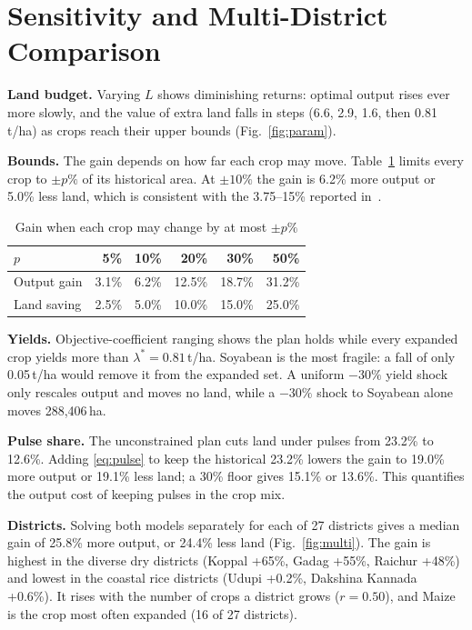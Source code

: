 \documentclass[conference]{IEEEtran}
\begin{document}
\section{Sensitivity and Multi-District Comparison}
\textbf{Land budget.} Varying $L$ shows diminishing returns: optimal output rises ever more
slowly, and the value of extra land falls in steps (6.6, 2.9, 1.6, then 0.81\,t/ha) as crops
reach their upper bounds (Fig.~\ref{fig:param}).

\textbf{Bounds.} The gain depends on how far each crop may move. Table~\ref{tab:band} limits
every crop to $\pm p\%$ of its historical area. At $\pm10\%$ the gain is 6.2\% more output or
5.0\% less land, which is consistent with the 3.75--15\% reported in~\cite{supriya2022}.

\begin{table}[!t]
\centering
\caption{Gain when each crop may change by at most $\pm p\%$}\label{tab:band}
\begin{tabular}{@{}lrrrrr@{}}
\toprule
$p$ & 5\% & 10\% & 20\% & 30\% & 50\%\\
\midrule
Output gain & 3.1\% & 6.2\% & 12.5\% & 18.7\% & 31.2\%\\
Land saving & 2.5\% & 5.0\% & 10.0\% & 15.0\% & 25.0\%\\
\bottomrule
\end{tabular}
\end{table}

\textbf{Yields.} Objective-coefficient ranging shows the plan holds while every expanded crop
yields more than $\lambda^*=0.81$\,t/ha. Soyabean is the most fragile: a fall of only
0.05\,t/ha would remove it from the expanded set. A uniform $-30\%$ yield shock only rescales
output and moves no land, while a $-30\%$ shock to Soyabean alone moves 288{,}406\,ha.

\textbf{Pulse share.} The unconstrained plan cuts land under pulses from 23.2\% to 12.6\%.
Adding \eqref{eq:pulse} to keep the historical 23.2\% lowers the gain to 19.0\% more output or
19.1\% less land; a 30\% floor gives 15.1\% or 13.6\%. This quantifies the output cost of
keeping pulses in the crop mix.

\textbf{Districts.} Solving both models separately for each of 27 districts gives a median gain
of 25.8\% more output, or 24.4\% less land (Fig.~\ref{fig:multi}). The gain is highest in the
diverse dry districts (Koppal +65\%, Gadag +55\%, Raichur +48\%) and lowest in the coastal
rice districts (Udupi +0.2\%, Dakshina Kannada +0.6\%). It rises with the number of crops a
district grows ($r=0.50$), and Maize is the crop most often expanded (16 of 27 districts).
\end{document}
